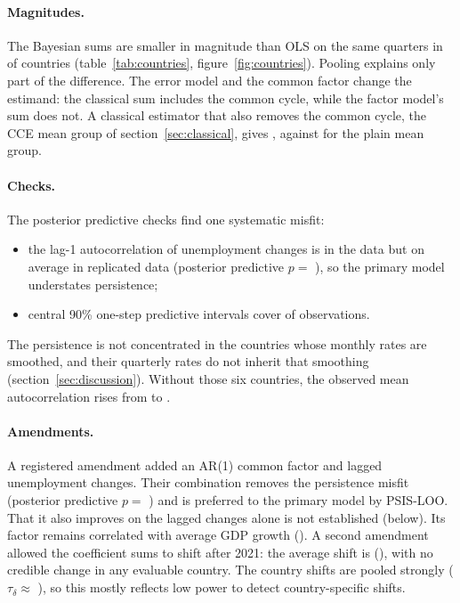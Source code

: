 \paragraph{Magnitudes.} The Bayesian sums are smaller in magnitude than OLS on the same
quarters in  of  countries (table~\ref{tab:countries},
figure~\ref{fig:countries}). Pooling
explains only part of the difference. The error model and the common factor change the
estimand: the classical sum includes the common cycle, while the factor model's sum does
not. A classical estimator that also removes the common cycle, the CCE mean group of
section~\ref{sec:classical}, gives , against  for the plain
mean group.

\paragraph{Checks.} The posterior predictive checks find one systematic misfit:
\begin{itemize}
  \item the lag-1 autocorrelation of unemployment changes is  in the data
    but  on average in replicated data (posterior predictive $p=$
    ), so the primary model understates persistence;
  \item central 90\% one-step predictive intervals cover  of observations.
\end{itemize}
The persistence is not concentrated in the countries whose monthly rates are smoothed,
and their quarterly rates do not inherit that smoothing (section~\ref{sec:discussion}).
Without those six countries, the observed mean autocorrelation rises from
 to .

\paragraph{Amendments.} A registered amendment added an AR(1) common factor and lagged
unemployment changes. Their combination removes the persistence misfit (posterior
predictive $p=$ ) and is preferred to the primary model by PSIS-LOO. That it
also improves on the lagged changes alone is not established (below). Its factor remains
correlated with average GDP growth (). A second amendment allowed the
coefficient sums to shift after 2021: the average shift is 
(), with no credible change in any evaluable country. The country shifts
are pooled strongly ($\tau_\delta\approx$ ), so this mostly reflects low power
to detect country-specific shifts.

